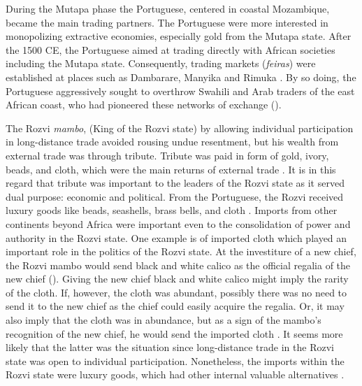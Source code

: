 During the  Mutapa phase the Portuguese, centered in coastal Mozambique, became the main trading partners. The Portuguese were more interested in monopolizing extractive economies, especially gold from the Mutapa state.
After the 1500 CE, the Portuguese aimed at trading directly with African societies including the Mutapa state. Consequently, trading markets (\emph{feiras}) were established at places such as Dambarare, Manyika and Rimuka \parencites{Pikirayi1993,Pikirayi2009}.
By so doing, the Portuguese aggressively sought to overthrow Swahili and Arab traders of the east African coast, who had pioneered these networks of
exchange (\cites{sinclair1987}{kusimba1999}{pwiti2005}).

The Rozvi \emph{mambo}, (King of the Rozvi state) by allowing individual participation in long-distance trade avoided rousing undue resentment, but his wealth from external trade was through tribute. Tribute was paid in form of gold, ivory, beads, and cloth, which were the main returns of external trade \parencite{mudenge1974}. It is in this regard that tribute was important to the leaders of the Rozvi state as it served dual purpose: economic and political.
From the Portuguese, the Rozvi received luxury goods like beads, seashells, brass bells, and cloth \parencite{mudenge1974}.
Imports from other continents beyond Africa were important even to the consolidation of power and authority in the Rozvi state. One example is of imported cloth which played an important role in the politics of the Rozvi state. At the investiture of a new chief, the Rozvi mambo would send black and white calico as the official regalia of the new chief (\cites{mudenge1974}{bvocho2005}).
Giving the new chief black and white calico might imply the rarity of the cloth. If, however,  the cloth was abundant, possibly there was no need to send it to the new chief as the chief could easily acquire the regalia. Or, it may also imply that the cloth was in abundance, but as a sign of the mambo’s recognition of the new chief, he would send the imported cloth
\parencite{bvocho2005}. It seems more likely that the latter was the situation since long-distance trade in the Rozvi state was open to individual participation. Nonetheless, the imports within the Rozvi state were luxury goods, which had other internal valuable alternatives
\parencite{mudenge1974}.

